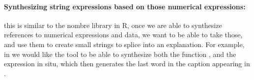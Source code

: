 \paragraph*{Synthesizing string expressions based on those numerical expressions:}
this is similar to the nombre library in R, once we are able to synthesize references
to numerical expressions and data, we want to be able to take those, and use them to
create small strings to splice into an explanation. For example, in 
we would like the tool to be able to synthesize both the function , and
the expression in situ, which then generates the last word in the caption appearing in
.
